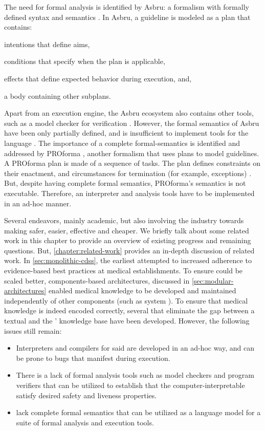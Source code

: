 The need for formal analysis is identified by Asbru: a formalism with formally
defined syntax and semantics \cite{ShaharAMIA96}. In Asbru, a guideline is modeled as a plan
that contains:
\begin{enumerate*}[label=(\roman*)]
  \item intentions that define aims,
  \item conditions that specify when the plan is applicable,
  \item effects that define expected behavior during execution, and,
  \item a body containing other subplans.
\end{enumerate*}
Apart from an execution engine, the Asbru ecosystem also contains
other tools, such as a model checker for verification \cite{BaumlerSPIN06}.
However, the formal semantics of Asbru have been only partially defined, and
is insufficient to implement tools for the language \cite{SuttonAMIA03}.
The importance of a complete formal-semantics is identified and addressed
by PROforma \cite{SuttonAMIA03}, another formalism that uses plans to
model guidelines. A PROforma plan is made of a sequence of tasks.
The plan defines constraints on their enactment, and circumstances
for termination (for example, exceptions) \cite{SuttonAMIA03}. But, despite
having complete formal semantics, PROforma's semantics is not executable.
Therefore, an interpreter and analysis tools have to be implemented in an
ad-hoc manner.

Several endeavors, mainly academic, but also involving the industry
towards making \CDSSs{} safer, easier, effective and cheaper.
We briefly talk about some related work in this chapter to
provide an overview of existing progress and remaining questions.
But, \autoref{chapter:related-work} provides an in-depth discussion
of related work. In \autoref{sec:monolithic-cdss},
the earliest \CDSSs{} attempted to increased adherence to evidence-based best practices
at medical establishments. To ensure \CDSSs{} could be scaled better,
components-based architectures, discussed in
\autoref{sec:modular-architectures} enabled medical knowledge to
be developed and maintained independently of other components (such as system
\UI{}). To ensure that medical knowledge is indeed encoded correctly,
several \DSLs{} that eliminate the gap between a textual \BPG{} and
the \CDSS{}' knowledge base have been developed. However,
the following issues still remain:
\begin{itemize}
  \item Interpreters and compilers for said \DSLs{} are developed in an
    ad-hoc way, and can be prone to bugs that manifest during execution.
  \item There is a lack of formal analysis tools such as model checkers and
    program verifiers that can be utilized to establish that the
    computer-interpretable \BPGs{} satisfy desired safety and liveness
    properties.
  \item \DSLs{} lack complete formal semantics that can be utilized
    as a language model for a suite of formal analysis and execution tools.
\end{itemize}

